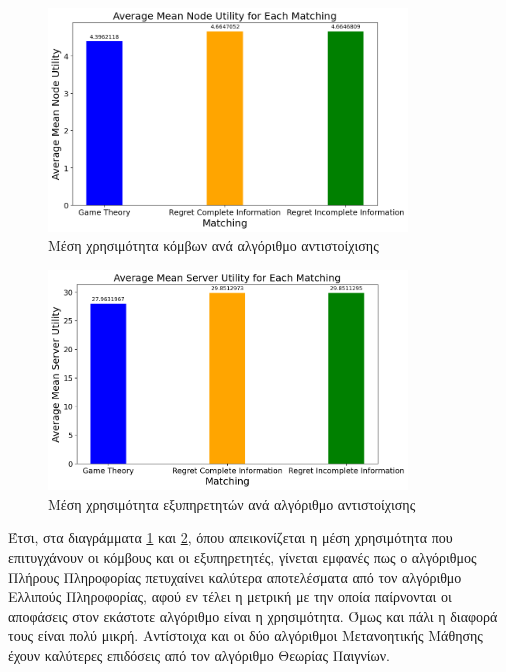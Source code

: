 \begin{figure}[H]
    \centering
    \includegraphics[width=0.85\textwidth]{figures/chapter4/Average_Mean_User_Utility.png}
    \caption{Μέση χρησιμότητα κόμβων ανά αλγόριθμο αντιστοίχισης}
    \label{fig27}
\end{figure}

\begin{figure}[H]
    \centering
    \includegraphics[width=0.85\textwidth]{figures/chapter4/Average_Mean_Server_Utility.png}
    \caption{Μέση χρησιμότητα εξυπηρετητών ανά αλγόριθμο αντιστοίχισης}
    \label{fig28}
\end{figure}

Έτσι, στα διαγράμματα \ref{fig27} και \ref{fig28}, όπου απεικονίζεται η μέση χρησιμότητα που επιτυγχάνουν οι κόμβους και οι εξυπηρετητές, γίνεται εμφανές πως ο αλγόριθμος Πλήρους Πληροφορίας πετυχαίνει καλύτερα αποτελέσματα από τον αλγόριθμο Ελλιπούς Πληροφορίας, αφού εν τέλει η μετρική με την οποία παίρνονται οι αποφάσεις στον εκάστοτε αλγόριθμο είναι η χρησιμότητα. Όμως και πάλι η διαφορά τους είναι πολύ μικρή. Αντίστοιχα και οι δύο αλγόριθμοι Μετανοητικής Μάθησης έχουν καλύτερες επιδόσεις από τον αλγόριθμο Θεωρίας Παιγνίων. 

